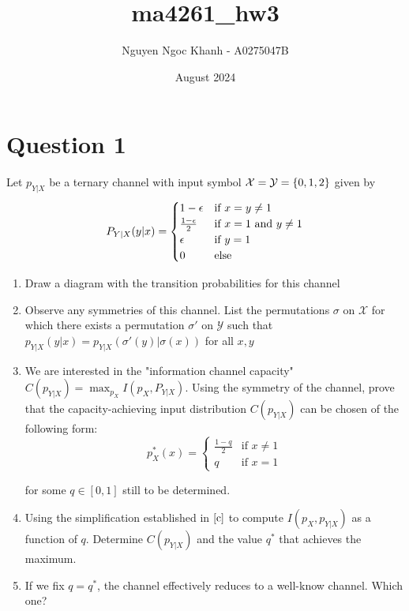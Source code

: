 \documentclass{article}
\title{ma4261\_hw3}
\author{Nguyen Ngoc Khanh - A0275047B}
\date{August 2024}
\begin{document}
\maketitle

\section{Question 1}
Let $p_{Y|X}$ be a ternary channel with input symbol $\mathcal{X} = \mathcal{Y} = \{0, 1, 2\}$ given by
$$
    P_{Y|X}(y|x) = \begin{cases}
        1 - \epsilon &\text{if $x = y \neq 1$} \\
        \frac{1-\epsilon}{2} &\text{if $x=1$ and $y \neq 1$} \\
        \epsilon &\text{if $y = 1$} \\
        0 &\text{else}
    \end{cases}
$$

\begin{enumerate}[label=(\alph*)]
    \item Draw a diagram with the transition probabilities for this channel
    
    \item Observe any symmetries of this channel. List the permutations $\sigma$ on $\mathcal{X}$ for which there exists a permutation $\sigma'$ on $\mathcal{Y}$ such that $p_{Y|X}(y|x) = p_{Y|X}(\sigma'(y) | \sigma(x))$ for all $x, y$

    \item \label{c} We are interested in the "information channel capacity" $C(p_{Y|X}) = \max_{p_X} I(p_X, P_{Y|X})$. Using the symmetry of the channel, prove that the capacity-achieving input distribution $C(p_{Y|X})$ can be chosen of the following form:
    $$
        p_X^*(x) = \begin{cases}
        \frac{1-q}{2} &\text{if $x \neq 1$} \\
        q &\text{if $x = 1$}
        \end{cases}
    $$

    for some $q \in [0, 1]$ still to be determined.

    \item Using the simplification established in $\ref{c}$ to compute $I(p_X, p_{Y|X})$ as a function of $q$. Determine $C(p_{Y|X})$ and the value $q^*$ that achieves the maximum.

    \item If we fix $q = q^*$, the channel effectively reduces to a well-know channel. Which one?
\end{enumerate}
\end{document}
